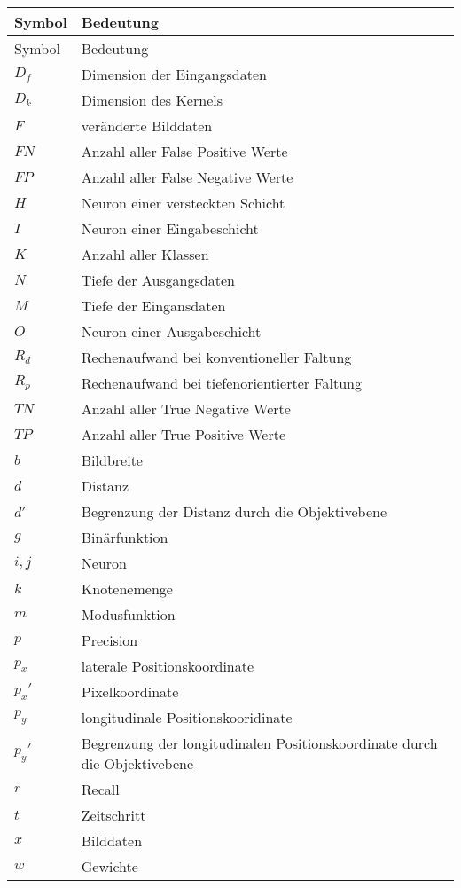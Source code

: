 \documentclass[12pt,a4paper,oneside,numbers=noenddot,headsepline,captions=tableheading,toc=bibliography,openany,tikz,margin=5mm]{scrbook}
\begin{document}
	\begin{longtable}{p{3cm}p{8cm}}
		\setlength\tabcolsep{9pt}
		Symbol & Bedeutung \\ \hline
		\endfirsthead
		Symbol & Bedeutung \\ \hline
		
		\endhead
		\toprule 
		$D_f$&Dimension der Eingangsdaten\\
		$D_k$&Dimension des Kernels\\
		$F$&veränderte Bilddaten\\
		$FN$&Anzahl aller False Positive Werte\\
		$FP$&Anzahl aller False Negative Werte\\
		$H$&Neuron einer versteckten Schicht\\
		$I$&Neuron einer Eingabeschicht\\
		$K$&Anzahl aller Klassen\\
		$N$&Tiefe der Ausgangsdaten\\
		$M$&Tiefe der Eingansdaten\\
		$O$&Neuron einer Ausgabeschicht\\
		$R_d$&Rechenaufwand bei konventioneller Faltung\\
		$R_p$&Rechenaufwand bei tiefenorientierter Faltung\\
		$TN$&Anzahl aller True Negative Werte\\
		$TP$&Anzahl aller True Positive Werte\\
		
		$b$&Bildbreite\\
		$d$&Distanz\\
		$d'$&Begrenzung der Distanz durch die Objektivebene\\
		$g$&Binärfunktion\\
		$i, j$&Neuron\\
		$k$&Knotenemenge\\
		$m$&Modusfunktion\\
		$p$&Precision\\
		$p_x$&laterale Positionskoordinate\\
		$p_x'$&Pixelkoordinate\\
		$p_y$&longitudinale Positionskooridinate\\
		$p_y'$&Begrenzung der longitudinalen Positionskoordinate durch die Objektivebene\\
		$r$&Recall\\
		$t$&Zeitschritt\\
		$x$&Bilddaten\\
		$w$&Gewichte	\\ 
		

\end{longtable}
\end{document}
